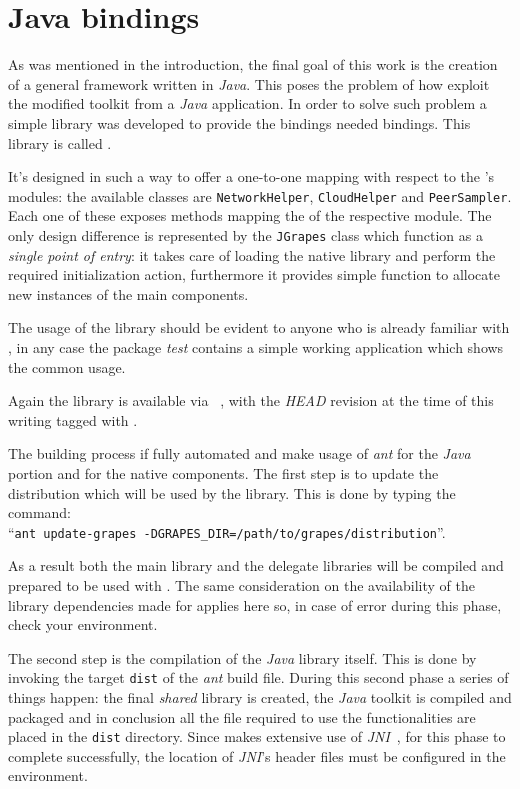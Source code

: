 \section{Java bindings}
As was mentioned in the introduction, the final goal of this work is
the creation of a general framework written in \emph{Java}. This poses
the problem of how exploit the modified \grapes toolkit from a
\emph{Java} application. In order to solve such problem a simple
library was developed to provide the bindings needed bindings. This
library is called \jgrapes.

It's designed in such a way to offer a one-to-one mapping with respect
to the \grapes's modules: the available classes are
\texttt{NetworkHelper}, \texttt{CloudHelper} and
\texttt{PeerSampler}. Each one of these exposes methods mapping the
\api of the respective \grapes module. The only design difference is
represented by the \texttt{JGrapes} class which function as a
\textit{single point of entry}: it takes care of loading the native
library and perform the required initialization action, furthermore it
provides simple function to allocate new instances of the main
components.

The usage of the library should be evident to anyone who is already
familiar with \grapes, in any case the package \emph{test} contains
a simple working application which shows the common usage.

Again the library is available via \github~\cite{jGRAPES-repo}, with
the \emph{HEAD} revision at the time of this writing tagged with
\thesistag.

The building process if fully automated and make usage of \emph{ant}
for the \emph{Java} portion and \make for the native components. The
first step is to update the \grapes distribution which will be used by
the library.
This is done by typing the command: \\
``\texttt{ant update-grapes
  -DGRAPES\_DIR=/path/to/grapes/distribution}''.

As a result both the
main \grapes library and the \cloudhelper delegate libraries will be
compiled and prepared to be used with \jgrapes. The same consideration
on the availability of the library dependencies made for
\grapes applies here so, in case of error during this phase, check
your environment.

The second step is the compilation of the \emph{Java} library
itself. This is done by invoking the target \texttt{dist} of the
\emph{ant} build file. During this second phase a series of things
happen: the final \emph{shared} library is created, the \textit{Java}
toolkit is compiled and packaged and in conclusion all the file
required to use the functionalities are placed in the \texttt{dist}
directory.
Since \jgrapes makes extensive use of \emph{JNI}~\cite{JNIGuide}, for this
phase to complete successfully, the location of \emph{JNI}'s header
files must be configured in the environment.

